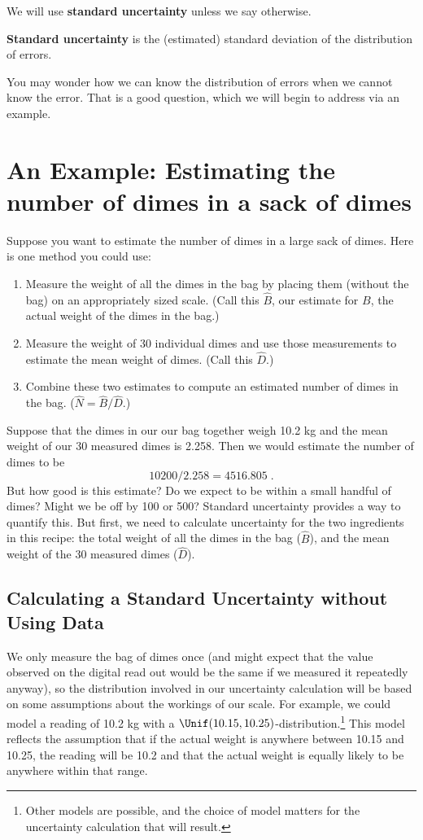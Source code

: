 \documentclass[twoside]{book}\usepackage[]{graphicx}\usepackage[]{xcolor}
\def\term#1{\textbf{#1}}
\newlength{\tempfmlength}
\newenvironment{fmpage}[1]
     {
	 \medskip
	 \setlength{\tempfmlength}{#1}
	 \begin{lrbox}{\fmbox}
	   \begin{minipage}{#1}
		 \vspace*{.02\tempfmlength}
		 \hfill
	   \begin{minipage}{.95 \tempfmlength}}
		 {\end{minipage}\hfill
		 \vspace*{.015\tempfmlength}
		 \end{minipage}\end{lrbox}\fbox{\usebox{\fmbox}}
	 \medskip
	 }
\newenvironment{boxedText}[1][.98\textwidth]%
{%
\begin{center}
\begin{fmpage}{#1}
}%
{%
\end{fmpage}
\end{center}
}
\newcounter{example}[section]
\begin{document}
We will use \term{standard uncertainty} unless we say otherwise.
\begin{boxedText}
	\term{Standard uncertainty} is the (estimated) standard deviation of 
	the distribution of errors.
\end{boxedText}
You may wonder how we can know the distribution of errors when we cannot know the error.
That is a good question, which we will begin to address via an example.

\section{An Example: Estimating the number of dimes in a sack of dimes}


Suppose you want to estimate the number of dimes in a large sack of dimes.  Here is one method
you could use:

\begin{enumerate}
	\item Measure the weight of all the dimes in the bag by placing them (without the bag)
		on an appropriately sized scale.  (Call this $\hat B$, our estimate for $B$,
		the actual weight of the dimes in the bag.)
	\item
		Measure the weight of 30 individual dimes and use those measurements to
		estimate the mean weight of dimes. (Call this $\hat D$.)
	\item
		Combine these two estimates to compute an estimated number of dimes in the bag.
		($\hat N = \hat B / \hat D$.)
\end{enumerate}

Suppose that the dimes in our our bag together weigh 10.2 kg and the mean weight of our 30 
measured dimes is 2.258. 
Then we would estimate the number of dimes to be 
\[
10200 / 2.258 = 4516.805 \;.
\]
But how good is this estimate?  Do we expect to be within a small handful of dimes?  Might we be 
off by 100 or 500?  Standard uncertainty provides a way to quantify this.  But first, 
we need to calculate uncertainty for the two ingredients in this recipe: 
the total weight of all the dimes in the bag ($\hat B$), and the mean weight of the 
30 measured dimes ($\hat D$).

\subsection{Calculating a Standard Uncertainty without Using Data}

We only measure the bag of dimes once (and might expect that the value
observed on the digital read out would be the same if we measured it repeatedly
anyway), so the distribution involved in our uncertainty calculation will be 
based on some assumptions about the workings of our scale.  For example, we could
model a reading of 10.2 kg with
a $\Unif(10.15, 10.25)$-distribution.\footnote{Other models are possible, and the choice of 
model matters for the uncertainty calculation that will result.}  
This model reflects the assumption that if the actual weight is anywhere between 10.15 and 10.25,
the reading will be 10.2 and that the actual weight is equally likely to be anywhere within
that range.
\end{document}
